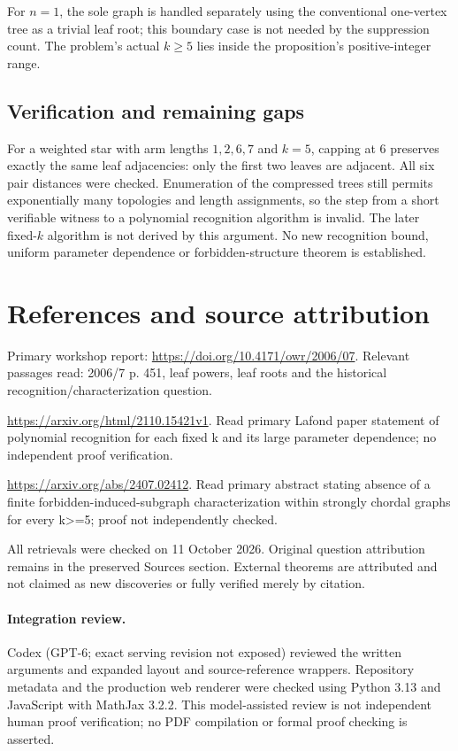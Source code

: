 \documentclass[11pt]{article}
\begin{document}
For $n=1$, the sole graph is handled separately using the conventional one-vertex tree as a trivial leaf root; this boundary case is not needed by the suppression count. The problem's actual $k\ge5$ lies inside the proposition's positive-integer range.
\subsection{Verification and remaining gaps}
For a weighted star with arm lengths $1,2,6,7$ and $k=5$, capping at 6 preserves exactly the same leaf adjacencies: only the first two leaves are adjacent. All six pair distances were checked. Enumeration of the compressed trees still permits exponentially many topologies and length assignments, so the step from a short verifiable witness to a polynomial recognition algorithm is invalid. The later fixed-$k$ algorithm is not derived by this argument. No new recognition bound, uniform parameter dependence or forbidden-structure theorem is established.

\section{References and source attribution}
Primary workshop report: \url{https://doi.org/10.4171/owr/2006/07}. Relevant passages read: 2006/7 p. 451, leaf powers, leaf roots and the historical recognition/characterization question.

\url{https://arxiv.org/html/2110.15421v1}. Read primary Lafond paper statement of polynomial recognition for each fixed k and its large parameter dependence; no independent proof verification.

\url{https://arxiv.org/abs/2407.02412}. Read primary abstract stating absence of a finite forbidden-induced-subgraph characterization within strongly chordal graphs for every k>=5; proof not independently checked.

All retrievals were checked on 11 October 2026. Original question attribution remains in the preserved Sources section. External theorems are attributed and not claimed as new discoveries or fully verified merely by citation.


\paragraph{Integration review.} Codex (GPT-6; exact serving revision not exposed) reviewed the written arguments and expanded layout and source-reference wrappers. Repository metadata and the production web renderer were checked using Python 3.13 and JavaScript with MathJax 3.2.2. This model-assisted review is not independent human proof verification; no PDF compilation or formal proof checking is asserted.
\end{document}
